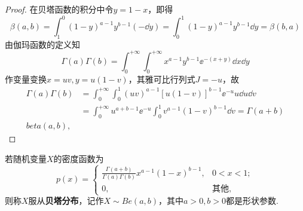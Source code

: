 \begin{proof}
    在贝塔函数的积分中令$y=1-x$，即得
    \[ \beta(a,b) = \int_1^0(1-y)^{a-1}y^{b-1}(-\dd y) = \int_0^1 (1-y)^{a-1}y^{b-1}\dd y = \beta(b,a) \]
    由伽玛函数的定义知
    \[ \Gamma(a) \Gamma(b) = \int_0^{+\infty}\int_0^{+\infty}x^{a-1}y^{b-1}  \ee^{-(x+y)} \dd x \dd y \]
    作变量变换$x=uv,y=u(1-v)$，其雅可比行列式$J=-u$，故
    \begin{align*}
        \Gamma(a)\Gamma(b) & = \int_0^{+\infty}\int_0^1(uv)^{a-1}[u(1-v)]^{b-1}
        \ee^{-u}u \dd u \dd v                                                                    \\
                           & = \int_0^{+\infty}u^{a+b-1}\ee^{-u} \int_0^1v^{a-1}(1-v)^{b-1}\dd v
        = \Gamma(a+b)                                                                            \\beta(a,b),
    \end{align*}
\end{proof}

\begin{definition}
    若随机变量$X$的密度函数为
    \[ p(x) = \begin{cases}
            \frac{\Gamma(a+b)}{\Gamma(a)\Gamma(b)}
            x^{a-1}(1-x)^{b-1}, & 0 < x < 1;   \\
            0,                  & \text{其他},
        \end{cases} \]
    则称$X$服从\textbf{贝塔分布}，记作$X\sim Be(a,b)$，其中$a>0,b>0$都是形状参数.
\end{definition}

